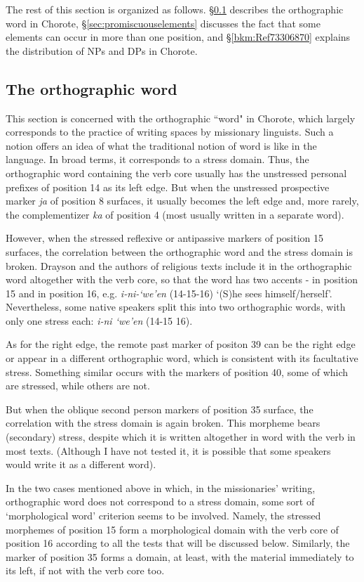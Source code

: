 \documentclass[output=paper]{langscibook}
\begin{document}
The rest of this section is organized as follows. §\ref{bkm:Ref99649617} describes the orthographic word in Chorote, §\ref{sec:promiscuouselements} discusses the fact that some elements can occur in more than one position, and §\ref{bkm:Ref73306870} explains the distribution of NPs and DPs in Chorote.

\subsection{The orthographic word}
\label{bkm:Ref99649617}
This section is concerned with the orthographic ``word" in Chorote, which largely corresponds to the practice of writing spaces by missionary linguists. Such a notion offers an idea of what the traditional notion of word is like in the language. In broad terms, it corresponds to a stress domain. Thus, the orthographic word containing the verb core usually has the unstressed personal prefixes of position 14 as its left edge. But when the unstressed prospective marker \textit{ja} of position 8 surfaces, it usually becomes the left edge and, more rarely, the complementizer \textit{ka} of position 4 (most usually written in a separate word). 

However, when the stressed reflexive or antipassive markers of position 15 surfaces, the correlation between the orthographic word and the stress domain is broken. Drayson and the authors of religious texts include it in the orthographic word altogether with the verb core, so that the word has two accents - in position 15 and in position 16, e.g. \textit{i-ni-`we'en} (14-15-16) `(S)he sees himself/herself'. Nevertheless, some native speakers split this into two orthographic words, with only one stress each: \textit{i-ni `we'en} (14-15 16).

As for the right edge, the remote past marker of positon 39 can be the right edge or appear in a different orthographic word, which is consistent with its facultative stress. Something similar occurs with the markers of position 40, some of which are stressed, while others are not.

But when the oblique second person markers of position 35 surface, the correlation with the stress domain is again broken. This morpheme bears (secondary) stress, despite which it is written altogether in word with the verb in most texts. (Although I have not tested it, it is possible that some speakers would write it as a different word). 

In the two cases mentioned above in which, in the missionaries' writing, orthographic word does not correspond to a stress domain, some sort of `morphological word' criterion seems to be involved. Namely, the stressed morphemes of position 15 form a morphological domain with the verb core of position 16 according to all the tests that will be discussed below. Similarly, the marker of position 35 forms a domain, at least, with the material immediately to its left, if not with the verb core too.
\end{document}

